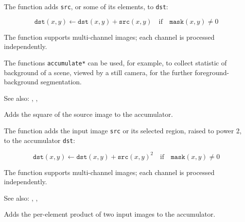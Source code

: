 The function adds \texttt{src}, or some of its elements, to \texttt{dst}:

\[ \texttt{dst}(x,y) \leftarrow \texttt{dst}(x,y) + \texttt{src}(x,y) \quad \text{if} \quad \texttt{mask}(x,y) \ne 0 \]

The function supports multi-channel images; each channel is processed independently.

The functions \texttt{accumulate*} can be used, for example, to collect statistic of background of a scene, viewed by a still camera, for the further foreground-background segmentation.

See also: , , 

Adds the square of the source image to the accumulator.

\begin{description}
\end{description}

The function adds the input image \texttt{src} or its selected region, raised to power 2, to the accumulator \texttt{dst}:

\[ \texttt{dst}(x,y) \leftarrow \texttt{dst}(x,y) + \texttt{src}(x,y)^2 \quad \text{if} \quad \texttt{mask}(x,y) \ne 0 \]

The function supports multi-channel images; each channel is processed independently.

See also: , , 

Adds the per-element product of two input images to the accumulator.

\begin{description}
\end{description}

